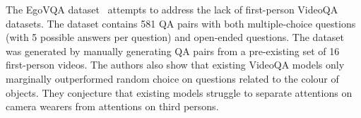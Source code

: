 \documentclass[../interim.tex]{subfiles}
\begin{document}
The EgoVQA dataset~\cite{dataset:ego-vqa} attempts to address the lack of first-person VideoQA datasets. The dataset contains 581 QA pairs with both multiple-choice questions (with 5 possible answers per question) and open-ended questions. The dataset was generated by manually generating QA pairs from a pre-existing set of 16 first-person videos. The authors also show that existing VideoQA models only marginally outperformed random choice on questions related to the colour of objects. They conjecture that existing models struggle to separate attentions on camera wearers from attentions on third persons.
\end{document}
